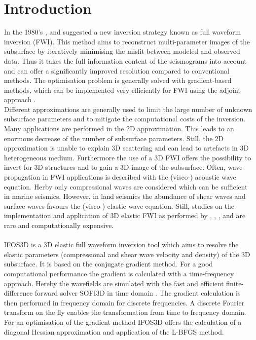 \chapter{Introduction}
In the 1980's \cite{Lai83}, \cite{Tar84} and \cite{Mor87} suggested a new inversion strategy known as full waveform inversion (FWI). This method aims to reconstruct multi-parameter images of the subsurface by iteratively minimising the misfit between modeled and observed data. Thus it takes the full information content of the seismograms into account and can offer a significantly improved resolution compared to conventional methods. The optimisation problem is generally solved with gradient-based methods, which can be implemented very efficiently for FWI using the adjoint approach \citep[e.g.][]{Tar84, Mor87}. \\
Different approximations are generally used to limit the large number of unknown subsurface parameters and to mitigate the computational costs of the inversion. Many applications are performed in the 2D approximation. This leads to an enormous decrease of the number of subsurface parameters. Still, the 2D approximation is unable to explain 3D scattering and can lead to artefacts in 3D heterogeneous medium. Furthermore the use of a 3D FWI offers the possibility to invert for 3D structures and to gain a 3D image of the subsurface. Often, wave propagation in FWI applications is described with the (visco-) acoustic wave equation. Herby only compressional waves are considered which can be sufficient in marine seismics. However, in land seismics the abundance of shear waves and surface waves favours the (visco-) elastic wave equation. Still,  studies on the implementation and application of 3D elastic FWI as performed by \cite{Epa08}, \cite{Fic09},  \cite{Cas11}, \cite{Gua12} and \cite{But13} are rare and computationally expensive.\\
\\
IFOS3D is a 3D elastic full waveform inversion tool which aims to resolve the elastic parameters (compressional and shear wave velocity and density) of the 3D subsurface. It is based on the conjugate gradient method. For a good computational performance the gradient is calculated with a time-frequency approach. Hereby the wavefields are simulated with the fast and efficient finite-difference forward solver SOFI3D in time domain \citep{boh02}. The gradient calculation is then performed in frequency domain for discrete frequencies. A discrete Fourier transform on the fly enables the transformation from time to frequency domain. For an optimisation of the gradient method IFOS3D offers the calculation of a diagonal Hessian approximation and application of the L-BFGS method.\\
